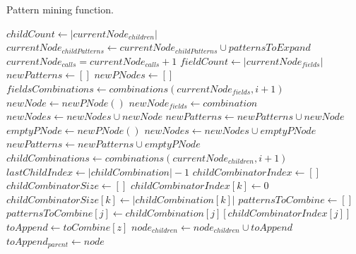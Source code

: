 \documentclass{acm_proc_article-sp-sigmod09}
\begin{document}
\begin{algorithm}
\caption{Pattern mining function.}
\label{pattern_mining}
\begin{algorithmic}[1]
\State $childCount \gets |currentNode_{children}|$
    \State $currentNode_{childPatterns} \gets currentNode_{childPatterns} \cup patternsToExpand$
\EndIf
\State $currentNode_{calls} = currentNode_{calls} + 1$
    \State $fieldCount \gets |currentNode_{fields}|$
    \State $newPatterns \gets []$
    \State $newPNodes \gets []$
            \State $fieldsCombinations \gets combinations(currentNode_{fields}, i + 1)$
                \State $newNode \gets new PNode()$
                \State $newNode_{fields} \gets combination$
                \State $newNodes \gets newNodes \cup newNode$
                \State $newPatterns \gets newPatterns \cup newNode$
            \EndFor
        \EndFor
    \EndIf
    \State $emptyPNode \gets new PNode()$
    \State $newNodes \gets newNodes \cup emptyPNode$
    \State $newPatterns \gets newPatterns \cup emptyPNode$
        \State $childCombinations \gets combinations(currentNode_{children}, i + 1)$
            \State $lastChildIndex \gets |childCombination| - 1$
            \State $childCombinatorIndex \gets []$
            \State $childCombinatorSize \gets []$
                \State $childCombinatorIndex[k] \gets 0$
                \State $childCombinatorSize[k] \gets |childCombination[k]|$
                    \State $patternsToCombine \gets []$
                        \State $patternsToCombine[j] \gets childCombination[j][childCombinatorIndex[j]]$
                    \EndFor
                            \State $toAppend \gets toCombine[z]$
                            \State $node_{children} \gets node_{children} \cup toAppend$
                            \State $toAppend_{parent} \gets node$
                        \EndFor

\end{algorithmic}
\end{algorithm}
\end{document}
